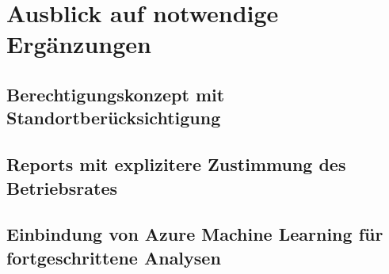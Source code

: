 \section{Ausblick auf notwendige Ergänzungen} \label{sec:praktischeUmsetzung:ausblick}

\subsection{Berechtigungskonzept mit Standortberücksichtigung}

\subsection{Reports mit explizitere Zustimmung des Betriebsrates}

\subsection{Einbindung von Azure Machine Learning für fortgeschrittene Analysen} \label{sec:praktischeUmsetzung:ausblick:aml}